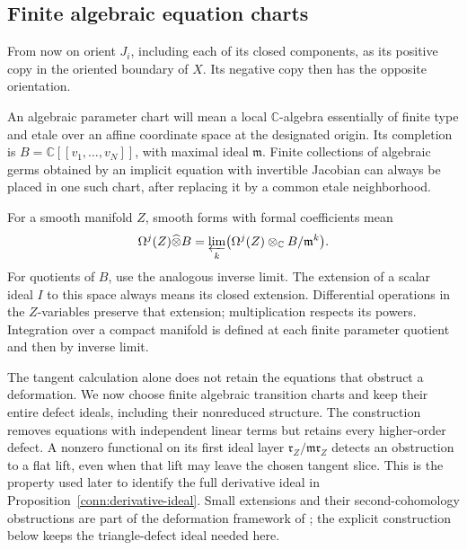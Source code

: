 \subsection{Finite algebraic equation charts}

From now on orient \(J_i\), including each of its closed components,
as its positive copy in the oriented boundary of \(X\).  Its
negative copy then has the opposite orientation.

\begin{definition}
\label{def:coefficient-convention}
An algebraic parameter chart will mean a local \(\mathbb C\)-algebra
essentially of finite type and etale over an affine coordinate
space at the designated origin.  Its completion is
\(B=\mathbb C[[v_1,\ldots,v_N]]\), with maximal ideal \(\mathfrak m\).
Finite collections of algebraic germs obtained by an implicit
equation with invertible Jacobian can always be placed in one such
chart, after replacing it by a common etale neighborhood.

For a smooth manifold \(Z\), smooth forms with formal coefficients
mean
\[
 \Omega^j(Z)\widehat\otimes B
   =\varprojlim_k\bigl(\Omega^j(Z)\otimes_{\mathbb C}
                                     B/\mathfrak m^k\bigr).
\]
For quotients of \(B\), use the analogous inverse limit.  The
extension of a scalar ideal \(I\) to this space always means its
closed extension.  Differential operations in the \(Z\)-variables
preserve that extension; multiplication respects its powers.
Integration over a compact manifold is defined at each finite
parameter quotient and then by inverse limit.
\end{definition}

The tangent calculation alone does not retain the equations that obstruct
a deformation.  We now choose finite algebraic transition charts and
keep their entire defect ideals, including their nonreduced structure.
The construction removes equations with independent linear terms but
retains every higher-order defect.  A nonzero functional on its first ideal
layer $\mathfrak r_Z/\mathfrak m\mathfrak r_Z$ detects an obstruction to
a flat lift, even when that lift may leave the chosen tangent slice.  This is
the property used later to identify the full derivative ideal in
Proposition~\ref{conn:derivative-ideal}.  Small extensions and their
second-cohomology obstructions are part of the deformation framework of
\cite[Proposition~2.6(1)]{GM1988}; the explicit construction below keeps
the triangle-defect ideal needed here.


